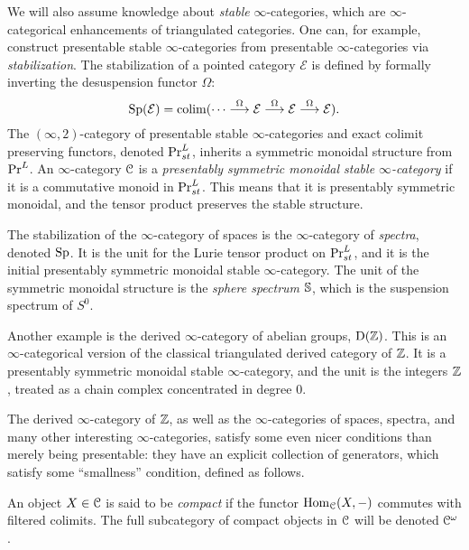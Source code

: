 We will also assume knowledge about \emph{stable} $\infty$-categories, which are $\infty$-categorical enhancements of triangulated categories. One can, for example, construct presentable stable $\infty$-categories from presentable $\infty$-categories via \emph{stabilization}. The stabilization of a pointed category $\mathcal{E}$ is defined by formally inverting the desuspension functor $\Omega$:
\[\Sp(\mathcal{E}) = \colim (\cdots\overset{\Omega}\to\mathcal{E}\overset{\Omega}\to\mathcal{E}\overset{\Omega}\to\mathcal{E}).\] 
The $(\infty, 2)$-category of presentable stable $\infty$-categories and exact colimit preserving functors, denoted $\PrLs$, inherits a symmetric monoidal structure from $\PrL$. An $\infty$-category $\C$ is a \emph{presentably symmetric monoidal stable $\infty$-category} if it is a commutative monoid in $\PrLs$. This means that it is presentably symmetric monoidal, and the tensor product preserves the stable structure. 

\begin{example}
    The stabilization of the $\infty$-category of spaces is the $\infty$-category of \emph{spectra}, denoted $\Sp$. It is the unit for the Lurie tensor product on $\PrLs$, and it is the initial presentably symmetric monoidal stable $\infty$-category. The unit of the symmetric monoidal structure is the \emph{sphere spectrum} $\S$, which is the suspension spectrum of $S^0$.  
\end{example}

\begin{example}
    Another example is the derived $\infty$-category of abelian groups, $\Der(\Z)$. This is an $\infty$-categorical version of the classical triangulated derived category of $\Z$. It is a presentably symmetric monoidal stable $\infty$-category, and the unit is the integers $\Z$, treated as a chain complex concentrated in degree $0$. 
\end{example}

The derived $\infty$-category of $\Z$, as well as the $\infty$-categories of spaces, spectra, and many other interesting $\infty$-categories, satisfy some even nicer conditions than merely being presentable: they have an explicit collection of generators, which satisfy some ``smallness'' condition, defined as follows. 

\begin{definition}
    \label{ch0:def:compact-object}
    An object $X\in \C$ is said to be \emph{compact} if the functor $\Hom_\C(X,-)$ commutes with filtered colimits. The full subcategory of compact objects in $\C$ will be denoted $\Co$.
\end{definition}

